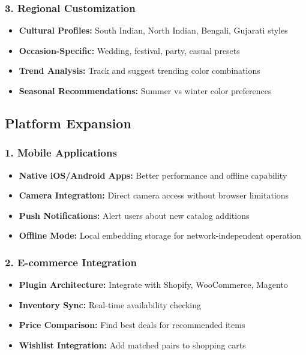 \documentclass[12pt,a4paper]{report}
\begin{document}
\subsubsection{3. Regional Customization}
\begin{itemize}
    \item \textbf{Cultural Profiles:} South Indian, North Indian, Bengali, Gujarati styles
    \item \textbf{Occasion-Specific:} Wedding, festival, party, casual presets
    \item \textbf{Trend Analysis:} Track and suggest trending color combinations
    \item \textbf{Seasonal Recommendations:} Summer vs winter color preferences
\end{itemize}

\subsection{Platform Expansion}

\subsubsection{1. Mobile Applications}
\begin{itemize}
    \item \textbf{Native iOS/Android Apps:} Better performance and offline capability
    \item \textbf{Camera Integration:} Direct camera access without browser limitations
    \item \textbf{Push Notifications:} Alert users about new catalog additions
    \item \textbf{Offline Mode:} Local embedding storage for network-independent operation
\end{itemize}

\subsubsection{2. E-commerce Integration}
\begin{itemize}
    \item \textbf{Plugin Architecture:} Integrate with Shopify, WooCommerce, Magento
    \item \textbf{Inventory Sync:} Real-time availability checking
    \item \textbf{Price Comparison:} Find best deals for recommended items
    \item \textbf{Wishlist Integration:} Add matched pairs to shopping carts
\end{itemize}
\end{document}
